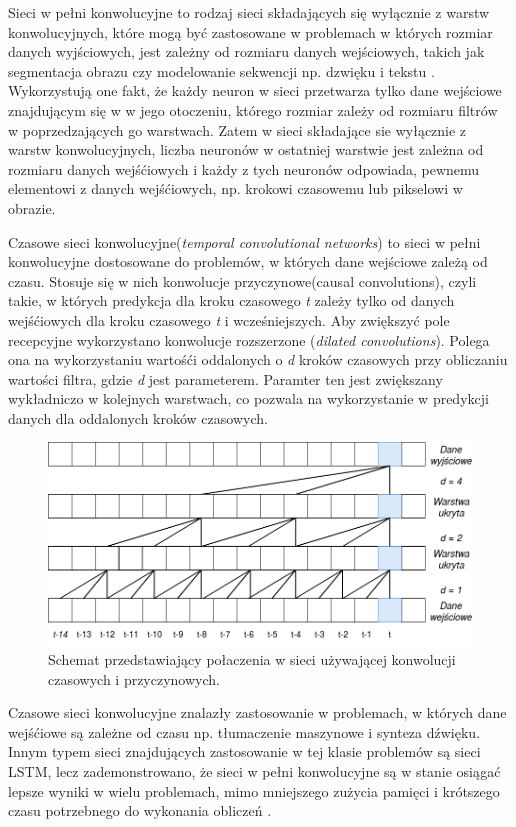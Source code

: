 \documentclass[a4paper,11pt,twoside]{report}
\theoremstyle{definition}
\begin{document}
Sieci w pełni konwolucyjne to rodzaj sieci składających się wyłącznie z warstw konwolucyjnych, które mogą być zastosowane w problemach w których rozmiar danych wyjściowych, jest zależny od rozmiaru danych wejściowych, takich jak segmentacja obrazu\cite{segmentation} czy modelowanie sekwencji np. dzwięku i tekstu \cite{sequenceModelling}. Wykorzystują one fakt, że każdy neuron w sieci przetwarza tylko dane wejściowe znajdującym się w w jego otoczeniu, którego rozmiar zależy od rozmiaru filtrów w poprzedzających go warstwach. Zatem w sieci składające sie wyłącznie z warstw konwolucyjnych, liczba neuronów w ostatniej warstwie jest zależna od rozmiaru danych wejśćiowych i każdy z tych neuronów odpowiada, pewnemu elementowi z danych wejśćiowych, np. krokowi czasowemu lub pikselowi w obrazie\cite{fcn}.

Czasowe sieci konwolucyjne(\textit{temporal convolutional networks}) to sieci w pełni konwolucyjne dostosowane do problemów, w których dane wejściowe zależą od czasu. Stosuje się w nich konwolucje przyczynowe(causal convolutions), czyli takie, w których predykcja dla kroku czasowego \textit{t} zależy tylko od danych wejśćiowych dla kroku czasowego \textit{t} i wcześniejszych. Aby zwiększyć pole recepcyjne wykorzystano konwolucje rozszerzone (\textit{dilated convolutions}). Polega ona na wykorzystaniu wartośći oddalonych o \textit{d} kroków czasowych przy obliczaniu wartości filtra, gdzie \textit{d} jest parameterem. Paramter ten jest zwiększany wykładniczo w kolejnych warstwach, co pozwala na wykorzystanie w predykcji danych dla oddalonych kroków czasowych.

\begin{figure}[h!]
	\centering
	\includegraphics[scale=0.5]{tcn}
	\caption{Schemat przedstawiający połaczenia w sieci używającej konwolucji czasowych i przyczynowych.}
\end{figure}

Czasowe sieci konwolucyjne znalazły zastosowanie w problemach, w których dane wejśćiowe są zależne od czasu np. tłumaczenie maszynowe\cite{fcnTranslation} i synteza dźwięku. Innym typem sieci znajdujących zastosowanie w tej klasie problemów są sieci LSTM\cite{lstm}, lecz zademonstrowano, że sieci w pełni konwolucyjne są w stanie osiągać lepsze wyniki w wielu problemach, mimo mniejszego zużycia pamięci i krótszego czasu potrzebnego do wykonania obliczeń \cite{sequenceModelling}.
\end{document}

